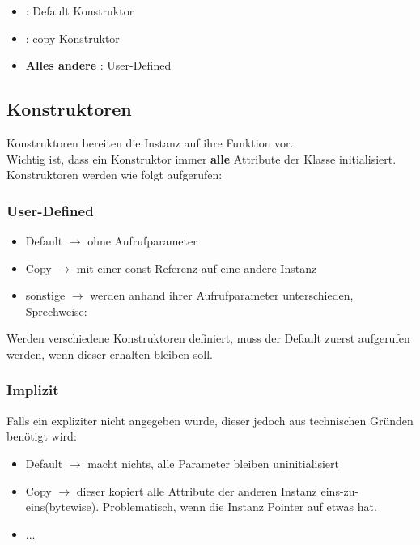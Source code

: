 \begin{itemize}[itemsep=1pt, parsep=0pt]
    \item \textbf{} : Default Konstruktor
    \item \textbf{} : copy Konstruktor
    \item \textbf{Alles andere} : User-Defined
\end{itemize}

\subsection{Konstruktoren}

Konstruktoren bereiten die Instanz auf ihre Funktion vor. \\

Wichtig ist, dass ein Konstruktor immer \textbf{alle} Attribute der Klasse initialisiert.
Konstruktoren werden wie folgt aufgerufen:\\

\subsubsection{User-Defined}

\begin{itemize}[itemsep=1pt, parsep=0pt]
    \item Default $\rightarrow$ ohne Aufrufparameter
    \item Copy $\rightarrow$ mit einer const Referenz auf eine andere Instanz
    \item sonstige $\rightarrow$ werden anhand ihrer Aufrufparameter unterschieden, Sprechweise:
\end{itemize}

Werden verschiedene Konstruktoren definiert, muss der Default zuerst aufgerufen werden, wenn dieser erhalten bleiben soll.\\

\subsubsection{Implizit}

Falls ein expliziter nicht angegeben wurde, dieser jedoch aus technischen Gründen benötigt wird:

\begin{itemize}[itemsep=1pt, parsep=0pt]
    \item Default $\rightarrow$ macht nichts, alle Parameter bleiben uninitialisiert
    \item Copy $\rightarrow$ dieser kopiert alle Attribute der anderen Instanz eins-zu-eins(bytewise). Problematisch, wenn die Instanz Pointer auf etwas hat.
    \item ...
\end{itemize}

